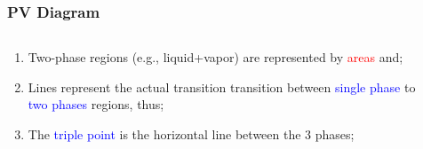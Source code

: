 \documentclass[10pt,compress]{beamer}
\begin{document}
\scriptsize
\begin{frame}
 \frametitle{PV Diagram}
  \begin{columns}
    \begin{column}[l]{0.5\linewidth}
      \begin{enumerate} \scriptsize
        \item<1-> Two-phase regions (e.g., liquid+vapor) are represented by \textcolor{red}{areas} and;
        \item<2-> Lines represent the actual transition transition between \textcolor{blue}{single phase} to \textcolor{blue}{two phases} regions, thus;
        \item<2-> The \textcolor{blue}{triple point} is the horizontal line between the 3 phases;
      \end{enumerate}
    \end{column}
    \begin{column}[l]{0.5\linewidth}\scriptsize
\end{column}
\end{columns}
\end{frame}
\end{document}
